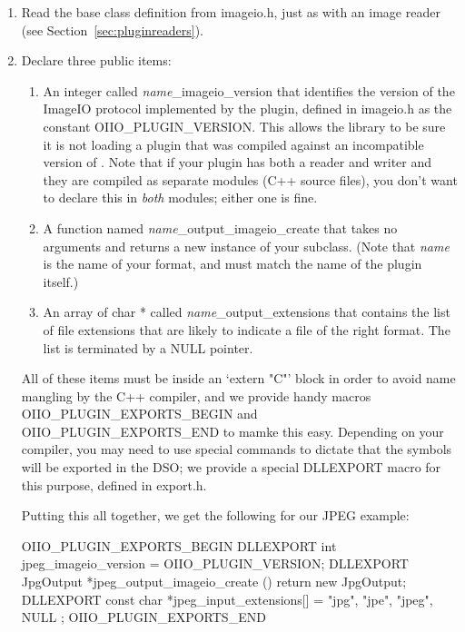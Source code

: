 \begin{enumerate}
\item Read the base class definition from {\fn imageio.h}, just as
  with an image reader (see Section~\ref{sec:pluginreaders}).

\item Declare three public items:

  \begin{enumerate}
    \item An integer called \emph{name}{\cf _imageio_version} that identifies
      the version of the ImageIO protocol implemented by the plugin,
      defined in {\fn imageio.h} as the constant {\cf OIIO_PLUGIN_VERSION}.
      This allows the library to be sure it is not loading a plugin
      that was compiled against an incompatible version of \product.
      Note that if your plugin has both a reader and writer and they
      are compiled as separate modules (C++ source files), you don't
      want to declare this in \emph{both} modules; either one is fine.
    \item A function named \emph{name}{\cf _output_imageio_create} that
      takes no arguments and returns a new instance of your \ImageOutput
      subclass.  (Note that \emph{name} is the name of your format,
      and must match the name of the plugin itself.)
    \item An array of {\cf char *} called \emph{name}{\cf _output_extensions}
      that contains the list of file extensions that are likely to indicate
      a file of the right format.  The list is terminated by a {\cf NULL}
      pointer.
  \end{enumerate}

  All of these items must be inside an `{\cf extern "C"}' block in order
  to avoid name mangling by the C++ compiler, and we provide handy
  macros {\cf OIIO_PLUGIN_EXPORTS_BEGIN} and {\cf OIIO_PLUGIN_EXPORTS_END}
  to mamke this easy.  Depending on your
  compiler, you may need to use special commands to dictate that the
  symbols will be exported in the DSO; we provide a special {\cf
  DLLEXPORT} macro for this purpose, defined in {\fn export.h}.

  Putting this all together, we get the following for our JPEG example:

  \begin{code}
    OIIO_PLUGIN_EXPORTS_BEGIN
        DLLEXPORT int jpeg_imageio_version = OIIO_PLUGIN_VERSION;
        DLLEXPORT JpgOutput *jpeg_output_imageio_create () {
            return new JpgOutput;
        }
        DLLEXPORT const char *jpeg_input_extensions[] = {
            "jpg", "jpe", "jpeg", NULL
        };
    OIIO_PLUGIN_EXPORTS_END
  \end{code}


\end{enumerate}
